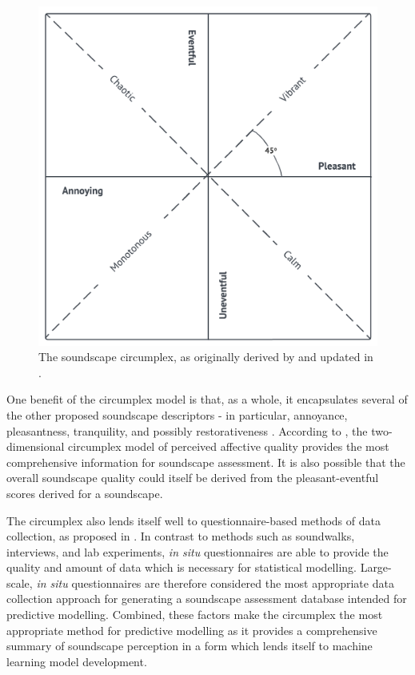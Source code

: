 \begin{figure}
  \centering
  \includegraphics{Figures/CircumplexOnly.png}
  \caption{The soundscape circumplex, as originally derived by \citet{Axelsson2010principal} and updated in \citet{ISO12913Part2}. \label{fig:circumplexOnly}}
\end{figure}

One benefit of the circumplex model is that, as a whole, it encapsulates several of the other proposed soundscape descriptors - in particular, annoyance, pleasantness, tranquility, and possibly restorativeness \citep{Aletta2016Soundscape}. According to \citet{Axelsson2015How}, the two-dimensional circumplex model of perceived affective quality provides the most comprehensive information for soundscape assessment. It is also possible that the overall soundscape quality could itself be derived from the pleasant-eventful scores derived for a soundscape.

The circumplex also lends itself well to questionnaire-based methods of data collection, as proposed in \citet{ISO12913Part2}. In contrast to methods such as soundwalks, interviews, and lab experiments, \textit{in situ} questionnaires are able to provide the quality and amount of data which is necessary for statistical modelling. Large-scale, \textit{in situ} questionnaires are therefore considered the most appropriate data collection approach for generating a soundscape assessment database intended for predictive modelling. Combined, these factors make the circumplex the most appropriate method for predictive modelling as it provides a comprehensive summary of soundscape perception in a form which lends itself to machine learning model development.

